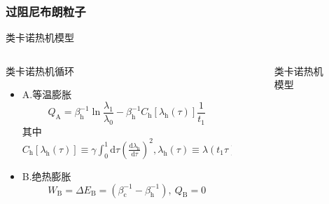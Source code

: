\documentclass{beamer}
\newcommand{\DD}[2]{\frac{\mathrm{d} #1}{\mathrm{d} #2}}
\begin{document}
\subsubsection{过阻尼布朗粒子}
\begin{frame}{类卡诺热机模型}
    \begin{columns}
        \begin{column}{.7\textwidth}
            \begin{block}{类卡诺热机循环}
            \begin{itemize}
            \item<2-> A.等温膨胀
            \begin{equation}
                Q_{\mathrm{A}} = \beta_{\mathrm{h}}^{-1} \ln{\frac{\lambda_1}{\lambda_0}} - \beta_{\mathrm{h}}^{-1} C_{\mathrm{h}} [\lambda_{\mathrm{h}}(\tau)] \frac{1}{t_1}     
                \label{eq3.16}
            \end{equation}
            其中$C_{\mathrm{h}} [\lambda_{\mathrm{h}}(\tau)] \equiv \gamma \int_{0}^{1} \mathrm{d} \tau \left(\DD{\lambda_{\mathrm{h}}}{\tau}\right)^2,\lambda_{\mathrm{h}}(\tau)\equiv\lambda({t_1 \tau})$
            \item<3-> B.绝热膨胀 
            \begin{equation}
                W_{\mathrm{B}} = \Delta E_{\mathrm{B}} = (\beta_{\mathrm{c}}^{-1} - \beta_{\mathrm{h}}^{-1}),\  Q_{\mathrm{B}}=0
                \label{eq3.17}
            \end{equation}
            \end{itemize}
            \end{block}          
        \end{column}
        \begin{column}{.4\textwidth}
        \begin{figure}
            \centering
            \def\svgwidth{\columnwidth}
            
            \setcounter{figure}{0}
            \caption{类卡诺热机模型}
            \end{figure}
        \end{column}   
    \end{columns}
\end{frame}
\end{document}

